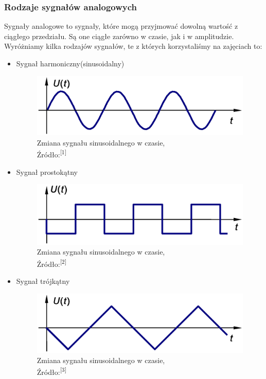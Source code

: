 \documentclass{article}
\begin{document}
    \subsubsection{Rodzaje sygnałów analogowych}
    Sygnały analogowe to sygnały, które mogą przyjmować dowolną wartość z ciągłego przedziału. Są one ciągłe zarówno w czasie, jak i w amplitudzie. Wyróżniamy kilka rodzajów sygnałów, te z których korzystaliśmy na zajęciach to:
    \begin{itemize}
      \item Sygnał harmoniczny(sinusoidalny)
      \begin{figure}[!ht]
        \begin{center}
            \includegraphics[scale=0.55]{grafiki/syg_har.eps}
            \caption{Zmiana sygnału sinusoidalnego w czasie,\\Źródło:\textsuperscript{[1]}}
        \end{center}
      \end{figure}
      \item Sygnał prostokątny
      \begin{figure}[!ht]
        \begin{center}
            \includegraphics[scale=0.55]{grafiki/syg_pros.eps}
            \caption{Zmiana sygnału sinusoidalnego w czasie,\\Źródło:\textsuperscript{[2]}}
        \end{center}
      \end{figure}
      \item Sygnał trójkątny
      \begin{figure}[!ht]
        \begin{center}
            \includegraphics[scale=0.55]{grafiki/syg_troj.eps}
            \caption{Zmiana sygnału sinusoidalnego w czasie,\\Źródło:\textsuperscript{[3]}}
        \end{center}
      \end{figure}
    \end{itemize}
\end{document}
